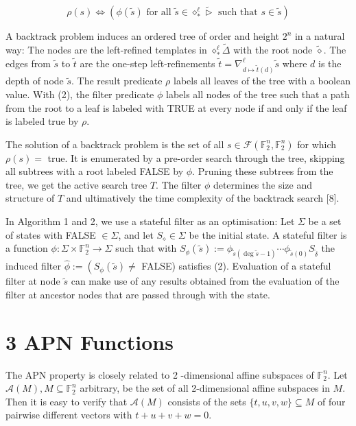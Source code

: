 \documentclass[10pt]{article}
\begin{document}
\begin{equation*}
\rho(s) \Longleftrightarrow\left(\phi(\tilde{s}) \text { for all } \tilde{s} \in \diamond_{*}^{\ell} \tilde{\triangleright} \text { such that } s \in \tilde{s}\right) \tag{2}
\end{equation*}


A backtrack problem induces an ordered tree of order and height $2^{n}$ in a natural way: The nodes are the left-refined templates in $\diamond_{*}^{\ell} \widetilde{\Delta}$ with the root node $\tilde{\diamond}$. The edges from $\tilde{s}$ to $\tilde{t}$ are the one-step left-refinements $\tilde{t}=\nabla_{d \mapsto \tilde{t}(d)}^{\ell} \tilde{s}$ where $d$ is the depth of node $\tilde{s}$. The result predicate $\rho$ labels all leaves of the tree with a boolean value. With (2), the filter predicate $\phi$ labels all nodes of the tree such that a path from the root to a leaf is labeled with TRUE at every node if and only if the leaf is labeled true by $\rho$.

The solution of a backtrack problem is the set of all $s \in \mathcal{F}\left(\mathbb{F}_{2}^{n}, \mathbb{F}_{2}^{n}\right)$ for which $\rho(s)=$ true. It is enumerated by a pre-order search through the tree, skipping all subtrees with a root labeled FALSE by $\phi$. Pruning these subtrees from the tree, we get the active search tree $T$. The filter $\phi$ determines the size and structure of $T$ and ultimatively the time complexity of the backtrack search [8].

In Algorithm 1 and 2, we use a stateful filter as an optimisation: Let $\Sigma$ be a set of states with FALSE $\in \Sigma$, and let $S_{\diamond} \in \Sigma$ be the initial state. A stateful filter is a function $\phi: \Sigma \times \mathbb{F}_{2}^{n} \rightarrow \Sigma$ such that with $S_{\phi}(\tilde{s}):=\phi_{\tilde{s}(\operatorname{deg} \tilde{s}-1)} \cdots \phi_{\tilde{s}(0)} S_{\tilde{\delta}}$ the induced filter $\hat{\phi}:=\left(S_{\phi}(\tilde{s}) \neq\right.$ FALSE) satisfies (2). Evaluation of a stateful filter at node $\tilde{s}$ can make use of any results obtained from the evaluation of the filter at ancestor nodes that are passed through with the state.

\section*{3 APN Functions}
The APN property is closely related to 2 -dimensional affine subspaces of $\mathbb{F}_{2}^{n}$. Let $\mathcal{A}(M), M \subseteq \mathbb{F}_{2}^{n}$ arbitrary, be the set of all 2-dimensional affine subspaces in $M$. Then it is easy to verify that $\mathcal{A}(M)$ consists of the sets $\{t, u, v, w\} \subseteq M$ of four pairwise different vectors with $t+u+v+w=0$.
\end{document}
